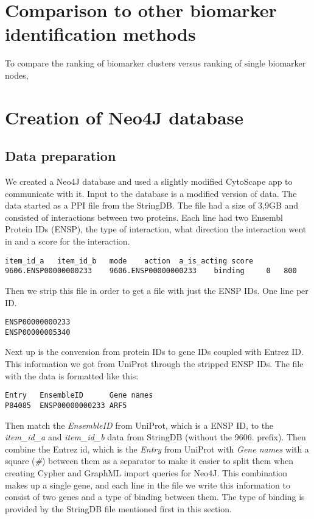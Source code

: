 \chapter{Comparison to other biomarker identification methods}
To compare the ranking of biomarker clusters versus ranking of single biomarker
nodes, %

\chapter{Creation of Neo4J database} %
\section{Data preparation}
We created a Neo4J database and used a slightly modified CytoScape app to
communicate with it. Input to the database is a modified version of data. The
data started as a PPI file from the StringDB. The file had a size of 3,9GB and
consisted of interactions between two proteins. Each line had two Ensembl
Protein IDs (ENSP), the type of interaction, what direction the interaction went
in and a score for the interaction. 

\begin{verbatim}
item_id_a	item_id_b	mode	action	a_is_acting	score
9606.ENSP00000000233	9606.ENSP00000000233	binding		0	800
\end{verbatim}

Then we strip this file in order to get a file with just the ENSP IDs. One line
per ID.

\begin{verbatim}
ENSP00000000233
ENSP00000005340
\end{verbatim}

Next up is the conversion from protein IDs to gene IDs coupled with Entrez ID.
This information we got from UniProt through the stripped ENSP IDs. The file
with the data is formatted like this:

\begin{verbatim}
Entry	EnsembleID	    Gene names
P84085	ENSP00000000233	ARF5
\end{verbatim}

Then match the \textit{EnsembleID} from UniProt, which is a ENSP ID, to the
\textit{item\_id\_a} and \textit{item\_id\_b} data from StringDB (without the
9606.  prefix). Then combine the Entrez id, which is the \textit{Entry} from
UniProt with \textit{Gene names} with a square (\textit{\#}) between them as
a separator to make it easier to split them when creating Cypher and GraphML
import queries for Neo4J. This combination makes up a single gene, and each line
in the file we write this information to consist of two genes and a type of
binding between them. The type of binding is provided by the StringDB file
mentioned first in this section. %

